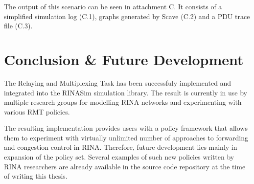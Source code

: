         The output of this scenario can be seen in attachment C. It consists of a simplified simulation log (C.1), graphs generated by Scave (C.2) and a PDU trace file (C.3).


\chapter{Conclusion \& Future Development}\label{conclusion}

    The Relaying and Multiplexing Task has been successfuly implemented and integrated into the RINASim simulation library. The result is currently in use by multiple research groups for modelling RINA networks and experimenting with various RMT policies.

    The resulting implementation provides users with a policy framework that allows them to experiment with virtually unlimited number of approaches to forwarding and congestion control in RINA. Therefore, future development lies mainly in expansion of the policy set. Several examples of such new policies written by RINA researchers are already available in the source code repository at the time of writing this thesis.


